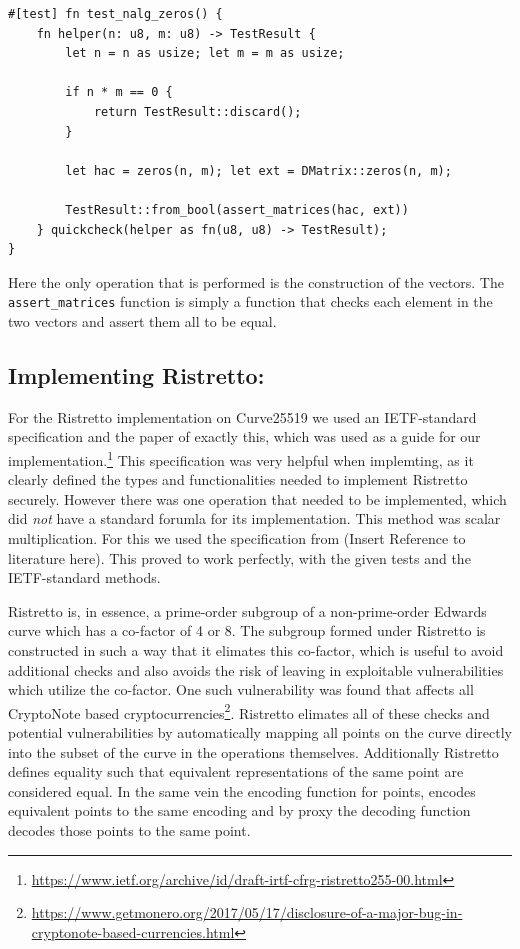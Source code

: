 \documentclass{article}
\begin{document}
\begin{lstlisting}
#[test] fn test_nalg_zeros() {
    fn helper(n: u8, m: u8) -> TestResult {
        let n = n as usize; let m = m as usize;

        if n * m == 0 {
            return TestResult::discard();
        }

        let hac = zeros(n, m); let ext = DMatrix::zeros(n, m);

        TestResult::from_bool(assert_matrices(hac, ext))
    } quickcheck(helper as fn(u8, u8) -> TestResult);
}
\end{lstlisting}

Here the only operation that is performed is the construction of the
vectors. The \texttt{assert\_matrices} function is simply a function
that checks each element in the two vectors and assert them all to
be equal.

\subsection{Implementing Ristretto:} \label{implementing-ristretto}

For the Ristretto implementation on Curve25519
we used an IETF-standard specification and the
paper of exactly this, which was used as a guide for our
implementation.\footnote{\url{https://www.ietf.org/archive/id/draft-irtf-cfrg-ristretto255-00.html}}
This specification was very helpful when implemting, as it clearly
defined the types and functionalities needed to implement Ristretto
securely. However there was one operation that needed to be implemented, which did \textit{not} have a standard forumla for its implementation. This method was scalar multiplication. For this we used the specification from (Insert Reference to literature here). This proved to work perfectly, with the given tests and the IETF-standard methods. 

Ristretto is, in essence, a prime-order subgroup of a non-prime-order
Edwards curve which has a co-factor of 4 or 8. The subgroup formed under
Ristretto is constructed in such a way that it elimates this co-factor,
which is useful to avoid additional checks and also avoids the risk of
leaving in exploitable vulnerabilities which utilize the co-factor. One
such vulnerability was found that affects all CryptoNote based
cryptocurrencies\footnote{\url{https://www.getmonero.org/2017/05/17/disclosure-of-a-major-bug-in-cryptonote-based-currencies.html}}.
Ristretto elimates all of these checks and potential vulnerabilities
by automatically mapping all points on the curve directly into the
subset of the curve in the operations themselves. Additionally Ristretto
defines equality such that equivalent representations of the same point
are considered equal. In the same vein the encoding function for points,
encodes equivalent points to the same encoding and by proxy the decoding
function decodes those points to the same point.
\end{document}
